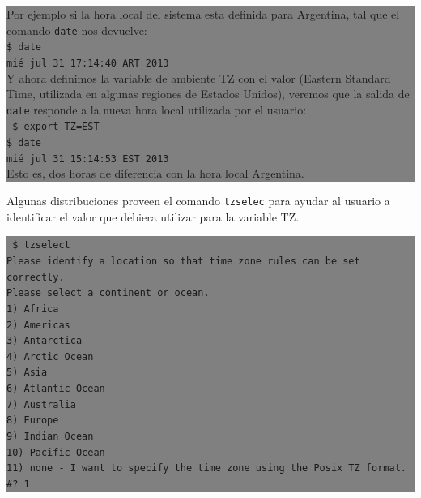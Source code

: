\documentclass[12pt]{article}
\begin{document}
\colorbox{grey}{\parbox[t]{0.95\linewidth}{ \vspace*{0.5cm} { 
Por ejemplo si la hora local del sistema esta definida para Argentina, tal que 
el comando \texttt{date} nos devuelve: \\
{\tt\$ date \\
mié jul 31 17:14:40 ART 2013} \\
Y ahora definimos la variable de ambiente TZ con el valor (Eastern Standard Time, utilizada en 
algunas regiones de Estados Unidos), veremos que la salida de \texttt{date} responde 
a la nueva hora local utilizada por el usuario: \\
{\tt
\$ export TZ=EST \\
\$ date \\
mié jul 31 15:14:53 EST 2013 \\
} 
Esto es, dos horas de diferencia con la hora local Argentina. 
 } \vspace*{0.5cm} } } 

Algunas distribuciones proveen el comando \texttt{tzselec} para ayudar al usuario a 
identificar el valor que debiera utilizar para la variable TZ.

\colorbox{grey}{\parbox[t]{0.95\linewidth}{ \vspace*{0.5cm} { 
{\tt 
\$ tzselect \\
Please identify a location so that time zone rules can be set correctly.\\
Please select a continent or ocean.\\
 1) Africa\\
 2) Americas\\
 3) Antarctica\\
 4) Arctic Ocean\\
 5) Asia\\
 6) Atlantic Ocean\\
 7) Australia\\
 8) Europe\\
 9) Indian Ocean\\
10) Pacific Ocean\\
11) none - I want to specify the time zone using the Posix TZ format.\\
\#? 1\\
}
 } \vspace*{0.5cm} } } 
\end{document}
